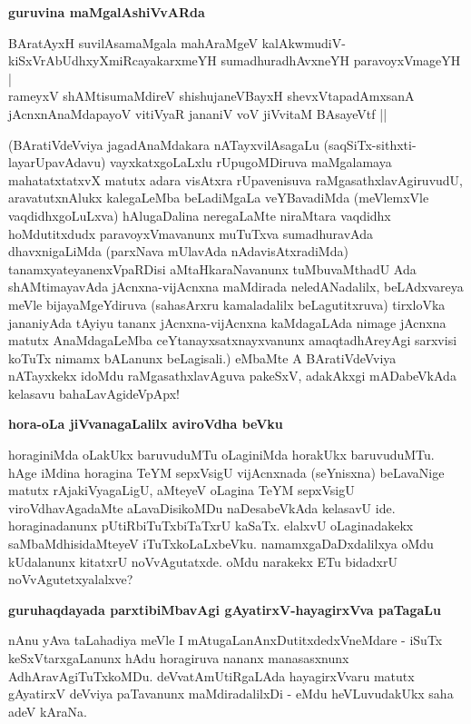 \noindent
\textbf{guruvina maMgalAshiVvARda}\label{page75}

\begin{shloka}
BAratAyxH suvilAsamaMgala mahAraMgeV kalAkwmudiV-\\\label{75}
kiSxVrAbUdhxyXmiRcayakarxmeYH sumadhuradhAvxneYH paravoyxVmageYH |\\
rameyxV shAMtisumaMdireV shishujaneVBayxH shevxVtapadAmxsanA\\
jAcnxnAnaMdapayoV vitiVyaR jananiV voV jiVvitaM BAsayeVtf ||
\end{shloka}

(BAratiVdeVviya jagadAnaMdakara nATayxvilAsagaLu (saqSiTx-sithxti-layarUpavAdavu) vayxkatxgoLaLxlu rUpugoMDiruva maMgalamaya mahatatxtatxvX matutx adara visAtxra rUpavenisuva raMgasathxlavAgiruvudU, aravatutxnAlukx kalegaLeMba beLadiMgaLa veYBavadiMda (meVlemxVle vaqdidhxgoLuLxva) hAlugaDalina neregaLaMte niraMtara vaqdidhx hoMdutitxdudx paravoyxVmavanunx muTuTxva sumadhuravAda dhavxnigaLiMda (parxNava mUlavAda nAdavisAtxradiMda) tanamxyateyanenxVpaRDisi aMtaHkaraNavanunx tuMbuvaMthadU Ada shAMtimayavAda jAcnxna-vijAcnxna maMdirada neledANadalilx, beLAdxvareya meVle bijayaMgeYdiruva (sahasArxru kamaladalilx beLagutitxruva) tirxloVka jananiyAda tAyiyu tananx jAcnxna-vijAcnxna kaMdagaLAda nimage jAcnxna matutx AnaMdagaLeMba ceYtanayxsatxnayxvanunx amaqtadhAreyAgi sarxvisi koTuTx nimamx bALanunx beLagisali.) eMbaMte A BAratiVdeVviya nATayxkekx idoMdu raMgasathxlavAguva pakeSxV, adakAkxgi mADabeVkAda kelasavu bahaLavAgideVpApx!

\noindent
\textbf{hora-oLa jiVvanagaLalilx aviroVdha beVku}\label{page201}

horaginiMda oLakUkx baruvuduMTu oLaginiMda horakUkx baruvuduMTu. hAge iMdina horagina TeYM sepxVsigU vijAcnxnada (seYnisxna) beLavaNige matutx rAjakiVyagaLigU, aMteyeV oLagina TeYM sepxVsigU viroVdhavAgadaMte aLavaDisikoMDu naDesabeVkAda kelasavU ide. horaginadanunx pUtiRbiTuTxbiTaTxrU kaSaTx. elalxvU oLaginadakekx saMbaMdhisidaMteyeV iTuTxkoLaLxbeVku. namamxgaDaDxdalilxya oMdu kUdalanunx kitatxrU noVvAgutatxde. oMdu narakekx ETu bidadxrU noVvAgutetxyalalxve?

\noindent
\textbf{guruhaqdayada parxtibiMbavAgi gAyatirxV-hayagirxVva paTagaLu}\label{page76}

nAnu yAva taLahadiya meVle I mAtugaLanAnxDutitxdedxVneMdare - iSuTx keSxVtarxgaLanunx hAdu horagiruva nananx manasasxnunx AdhAravAgiTuTxkoMDu. deVvatAmUtiRgaLAda hayagirxVvaru matutx gAyatirxV deVviya paTavanunx maMdiradalilxDi - eMdu heVLuvudakUkx saha adeV kAraNa.

